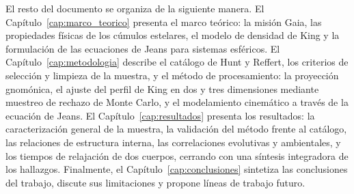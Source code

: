         El resto del documento se organiza de la siguiente manera. El 
        Capítulo~\ref{cap:marco_teorico} presenta el marco teórico: la misión 
        Gaia, las propiedades físicas de los cúmulos estelares, el modelo de 
        densidad de King y la formulación de las ecuaciones de Jeans para 
        sistemas esféricos. El Capítulo~\ref{cap:metodologia} describe el 
        catálogo de Hunt y Reffert, los criterios de selección y limpieza de la 
        muestra, y el método de procesamiento: la proyección gnomónica, el 
        ajuste del perfil de King en dos y tres dimensiones mediante muestreo de 
        rechazo de Monte Carlo, y el modelamiento cinemático a través de la 
        ecuación de Jeans. El Capítulo~\ref{cap:resultados} presenta los 
        resultados: la caracterización general de la muestra, la validación del 
        método frente al catálogo, las relaciones de estructura interna, las 
        correlaciones evolutivas y ambientales, y los tiempos de relajación de 
        dos cuerpos, cerrando con una síntesis integradora de los hallazgos. 
        Finalmente, el Capítulo~\ref{cap:conclusiones} sintetiza las 
        conclusiones del trabajo, discute sus limitaciones y propone líneas de 
        trabajo futuro.